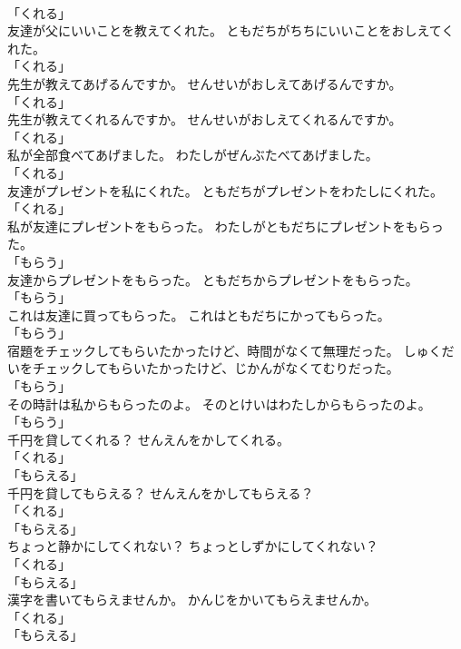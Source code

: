 \documentclass[8pt]{extreport}
\begin{document}
\begin{CJK}{UTF8}{min}
\\	「くれる」	
\\	友達が父にいいことを教えてくれた。	ともだちがちちにいいことをおしえてくれた。	
\\	「くれる」	
\\	先生が教えてあげるんですか。	せんせいがおしえてあげるんですか。	
\\	「くれる」	
\\	先生が教えてくれるんですか。	せんせいがおしえてくれるんですか。	
\\	「くれる」	
\\	私が全部食べてあげました。	わたしがぜんぶたべてあげました。	
\\	「くれる」	
\\	友達がプレゼントを私にくれた。	ともだちがプレゼントをわたしにくれた。	
\\	「くれる」	
\\	私が友達にプレゼントをもらった。	わたしがともだちにプレゼントをもらった。	
\\	「もらう」	
\\	友達からプレゼントをもらった。	ともだちからプレゼントをもらった。	
\\	「もらう」	
\\	これは友達に買ってもらった。	これはともだちにかってもらった。	
\\	「もらう」	
\\	宿題をチェックしてもらいたかったけど、時間がなくて無理だった。	しゅくだいをチェックしてもらいたかったけど、じかんがなくてむりだった。	
\\	「もらう」	
\\	その時計は私からもらったのよ。	そのとけいはわたしからもらったのよ。	
\\	「もらう」	
\\	千円を貸してくれる？	せんえんをかしてくれる。	
\\	「くれる」 
\\	「もらえる」	
\\	千円を貸してもらえる？	せんえんをかしてもらえる？	
\\	「くれる」 
\\	「もらえる」	
\\	ちょっと静かにしてくれない？	ちょっとしずかにしてくれない？	
\\	「くれる」 
\\	「もらえる」	
\\	漢字を書いてもらえませんか。	かんじをかいてもらえませんか。	
\\	「くれる」 
\\	「もらえる」	

\end{CJK}
\end{document}
